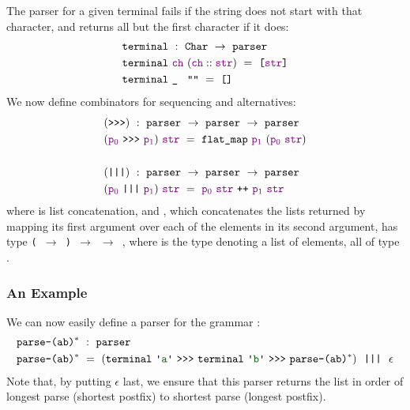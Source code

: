       The parser for a given terminal fails if the string does not start with that character, and returns all but the first character if it does:
\begin{align*}
&\fname{terminal}~:~\indname{Char}~\to~\fname{parser}\\
&\fname{terminal}~\farg{ch}~(\cons{\farg{ch}}{\farg{str}})~=~\valuelist{\farg{str}} \\
&\fname{terminal}~\aswidthof{\termhole}{\farg{ch}}~\str{}~=~\nil
\end{align*}
      We now define combinators for sequencing and alternatives:
\newcommand{\sequencing}{\fname{>{}>{}>}}
\begin{align*}
&(\sequencing)~:~\fname{parser}~\to~\fname{parser}~\to~\fname{parser}\\
&(\farg{p\ensuremath{_0}}~\sequencing~\farg{p\ensuremath{_1}})~\farg{str}~=~\fname{flat\_map}~\farg{p\ensuremath{_1}}~(\farg{p\ensuremath{_0}}~\farg{str}) \\ \\
&(\fname{|||})~:~\fname{parser}~\to~\fname{parser}~\to~\fname{parser}\\
&(\farg{p\ensuremath{_0}}~\fname{|||}~\farg{p\ensuremath{_1}})~\farg{str}~=~\farg{p\ensuremath{_0}}~\farg{str}~\fname{++}~\farg{p\ensuremath{_1}}~\farg{str}
\end{align*}
      where \fname{++} is list concatenation, and , which concatenates the lists returned by mapping its first argument over each of the elements in its second argument, has type \texttt{( $\to$ ) $\to$  $\to$ }, where  is the type denoting a list of elements, all of type .
      
    \subsubsection{An Example}
    
      We can now easily define a parser for the grammar :
\begin{align*}
&\fname{parse-\regex{(ab)\ensuremath{^*}}}~:~\fname{parser} \\
&\fname{parse-\regex{(ab)\ensuremath{^*}}}~=~(\fname{terminal}~\terminal{a}~\sequencing~\fname{terminal}~\terminal{b}~\sequencing~\fname{parse-\regex{(ab)\ensuremath{^*}}})~~\fname{|||}~~\epsilon
\end{align*}
      Note that, by putting $\epsilon$ last, we ensure that this parser returns the list in order of longest parse (shortest postfix) to shortest parse (longest postfix).
      
